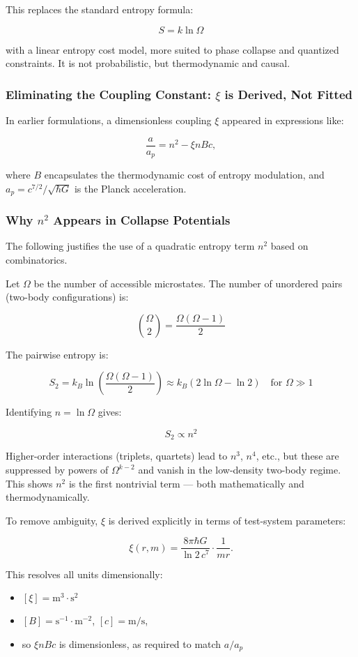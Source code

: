 \documentclass[12pt]{article}
\begin{document}
This replaces the standard entropy formula:

\[
S = k \ln \Omega
\]

\noindent
with a linear entropy cost model, more suited to phase collapse and quantized constraints. It is not probabilistic, but thermodynamic and causal.

\subsubsection*{Eliminating the Coupling Constant: $\xi$ is Derived, Not Fitted}

In earlier formulations, a dimensionless coupling $\xi$ appeared in expressions like:

\[
\frac{a}{a_p} = n^2 - \xi n B c,
\]

where $B$ encapsulates the thermodynamic cost of entropy modulation, and $a_p = c^{7/2} / \sqrt{\hbar G}$ is the Planck acceleration.

\subsubsection*{Why $n^2$ Appears in Collapse Potentials}

The following justifies the use of a quadratic entropy term $n^2$ based on combinatorics.

Let $\Omega$ be the number of accessible microstates. The number of unordered pairs (two-body configurations) is:

\[
\binom{\Omega}{2} = \frac{\Omega(\Omega - 1)}{2}
\]

The pairwise entropy is:

\[
S_2 = k_B \ln\left( \frac{\Omega(\Omega - 1)}{2} \right) \approx k_B \left( 2\ln \Omega - \ln 2 \right) \quad \text{for } \Omega \gg 1
\]

Identifying $n = \ln \Omega$ gives:

\[
S_2 \propto n^2
\]

Higher-order interactions (triplets, quartets) lead to $n^3$, $n^4$, etc., but these are suppressed by powers of $\Omega^{k-2}$ and vanish in the low-density two-body regime. This shows $n^2$ is the first nontrivial term — both mathematically and thermodynamically.


To remove ambiguity, $\xi$ is derived explicitly in terms of test-system parameters:

\[
\boxed{\xi(r,m) = \frac{8\pi \hbar G}{\ln 2 \, c^7} \cdot \frac{1}{mr}}.
\]

This resolves all units dimensionally:
\begin{itemize}
    \item $[\xi] = \text{m}^3 \cdot \text{s}^2$
    \item $[B] = \text{s}^{-1} \cdot \text{m}^{-2}$, $[c] = \text{m/s}$,
    \item so $\xi n B c$ is dimensionless, as required to match $a / a_p$
\end{itemize}
\end{document}
